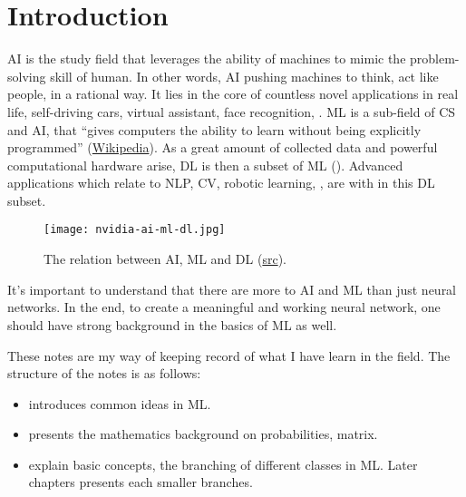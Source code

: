 \chapter{Introduction}

\ac{AI} is the study field that leverages the ability of machines to mimic the problem-solving skill of human. In other words, \ac{AI} pushing machines to think, act like people, in a rational way. It lies in the core of countless novel applications in real life, self-driving cars, virtual assistant, face recognition, \etc. \ac{ML} is a sub-field of \ac{CS} and \ac{AI}, that “gives computers the ability to learn without being explicitly programmed” (\href{https://en.wikipedia.org/wiki/Machine_learning}{Wikipedia}). As a great amount of collected data and powerful computational hardware arise, \ac{DL} is then a subset of \ac{ML} (). Advanced applications which relate to \ac{NLP}, \ac{CV}, robotic learning, \etc, are with in this \ac{DL} subset.
\begin{figure}[hbt!]
	\centering
	\texttt{[image: nvidia-ai-ml-dl.jpg]}
	\caption{The relation between \ac{AI}, \ac{ML} and \ac{DL} (\href{https://developer.nvidia.com/deep-learning}{src}).}
	\label{fig:relation-ai-ml-dl}
\end{figure}

It's important to understand that there are more to \ac{AI} and \ac{ML} than just neural networks. In the end, to create a meaningful and working neural network, one should have strong background in the basics of \ac{ML} as well.

These notes are my way of keeping record of what I have learn in the field. The structure of the notes is as follows:
\begin{itemize}
	\item {} introduces common ideas in \ac{ML}.
	\item {} presents the mathematics background on probabilities, matrix.
	\item {} explain basic concepts, the branching of different classes in \ac{ML}. Later chapters presents each smaller branches.
\end{itemize}


